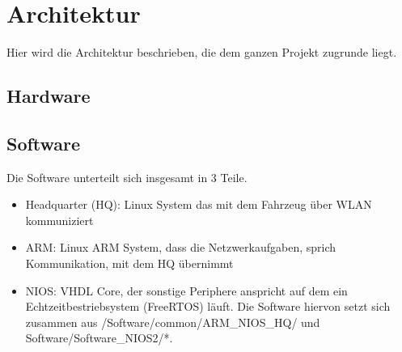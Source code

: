 \chapter{Architektur}
Hier wird die Architektur beschrieben, die dem ganzen Projekt zugrunde liegt.
\section{Hardware}

\section{Software}
Die Software unterteilt sich insgesamt in 3 Teile.
\begin{itemize}
 \item Headquarter (HQ): Linux System das mit dem Fahrzeug über WLAN kommuniziert
 \item ARM: Linux ARM System, dass die Netzwerkaufgaben, sprich Kommunikation, mit dem HQ übernimmt
 \item NIOS: VHDL Core, der sonstige Periphere anspricht auf dem ein Echtzeitbestriebsystem (FreeRTOS) läuft. Die Software hiervon setzt sich zusammen aus /Software/common/ARM\_NIOS\_HQ/ und Software/Software\_NIOS2/*.
\end{itemize}

